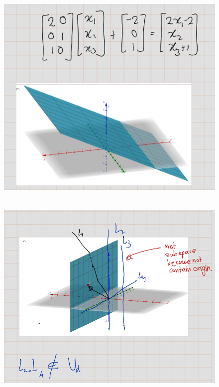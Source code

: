 \documentclass[
]{book}
\theoremstyle{definition}
\theoremstyle{definition}
\theoremstyle{definition}
\theoremstyle{definition}
\theoremstyle{remark}
\begin{document}
\begin{figure}
\centering
\includegraphics{figures/Examples/fig4.png}
\caption{\label{fig:fige04}\(~\)}
\end{figure}

\begin{figure}
\centering
\includegraphics{figures/Examples/fig3.png}
\caption{\label{fig:fige03}\(~\)}
\end{figure}

  
\end{document}
